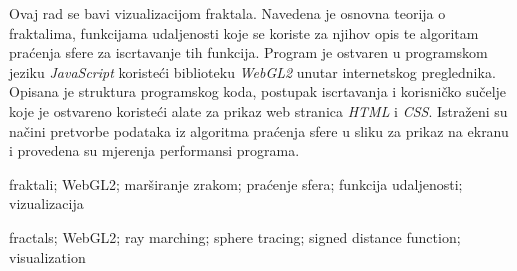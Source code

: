 \documentclass[zavrsnirad, upload]{fer}
\begin{document}
\begin{sazetak}
Ovaj rad se bavi vizualizacijom fraktala. Navedena je osnovna teorija o fraktalima, funkcijama udaljenosti koje se koriste za njihov opis te algoritam praćenja sfere za iscrtavanje tih funkcija. Program je ostvaren u programskom jeziku \emph{JavaScript} koristeći biblioteku \emph{WebGL2} unutar internetskog preglednika. Opisana je struktura programskog koda, postupak iscrtavanja i korisničko sučelje koje je ostvareno koristeći alate za prikaz web stranica \emph{HTML} i \emph{CSS}. Istraženi su načini pretvorbe podataka iz algoritma praćenja sfere u sliku za prikaz na ekranu i provedena su mjerenja performansi programa.
\end{sazetak}

\begin{kljucnerijeci}
  fraktali; WebGL2; marširanje zrakom; praćenje sfera; funkcija udaljenosti; vizualizacija
\end{kljucnerijeci}

\begin{abstract}
This paper deals with the visualization of fractals. The basic theory of fractals is presented, along with the distance functions used to describe them and the sphere tracing algorithm for rendering those functions. The program was implemented in the \emph{JavaScript} programming language using the \emph{WebGL2} library within a web browser. The structure of the program code, the rendering process, and the user interface implemented using the web page display tools \emph{HTML} and \emph{CSS} are described. Methods for converting data from the sphere tracing algorithm into an image for display on screen are explored, and performance measurements of the program are conducted.
\end{abstract}

\begin{keywords}
  fractals; WebGL2; ray marching; sphere tracing; signed distance function; visualization
\end{keywords}



\end{document}

